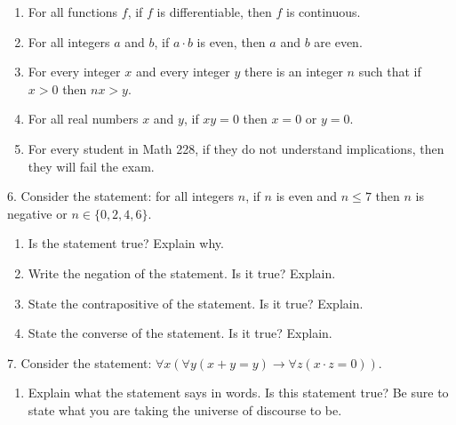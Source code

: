\documentclass[10pt,]{book}
\theoremstyle{plain}
\theoremstyle{definition}
\theoremstyle{definition}
\theoremstyle{definition}
\numberwithin{equation}{chapter}
\def\imp{\rightarrow}
\begin{document}
\begin{exerciselist}
\begin{enumerate}[label=(\alph*)]
\item\hypertarget{li-1123}{}
                For all functions \(f\), if \(f\) is differentiable, then \(f\) is continuous.
\item\hypertarget{li-1124}{}
                For all integers \(a\) and \(b\), if \(a\cdot b\) is even, then \(a\) and \(b\) are even.
\item\hypertarget{li-1125}{}
                For every integer \(x\) and every integer \(y\) there is an integer \(n\) such that if \(x > 0\) then \(nx > y\).
\item\hypertarget{li-1126}{}
                For all real numbers \(x\) and \(y\), if \(xy = 0\) then \(x = 0\) or \(y = 0\).
\item\hypertarget{li-1127}{}
                For every student in Math 228, if they do not understand implications, then they will fail the exam.
\end{enumerate}
\par\smallskip
\item[6.]\hypertarget{exercise-249}{}
            Consider the statement: for all integers \(n\), if \(n\) is even and \(n \le 7\) then \(n\) is negative or \(n \in \{0,2,4,6\}\).
\leavevmode%
\begin{enumerate}[label=(\alph*)]
\item\hypertarget{li-1137}{}
                Is the statement true? Explain why.
\item\hypertarget{li-1138}{}
                Write the negation of the statement. Is it true? Explain.
\item\hypertarget{li-1139}{}
                State the contrapositive of the statement. Is it true? Explain.
\item\hypertarget{li-1140}{}
                State the converse of the statement. Is it true? Explain.
\end{enumerate}
\par\smallskip
\item[7.]\hypertarget{exercise-250}{}
            Consider the statement: \(\forall x (\forall y (x + y = y) \imp \forall z (x\cdot z = 0))\).
\leavevmode%
\begin{enumerate}[label=(\alph*)]
\item\hypertarget{li-1145}{}
                Explain what the statement says in words. Is this statement true? Be sure to state what you are taking the universe of discourse to be.

\end{enumerate}
\end{exerciselist}
\end{document}
